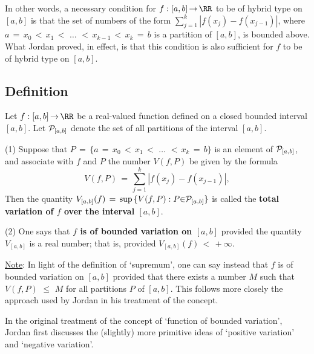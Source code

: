     In other words, a necessary condition for $f:[a,b] \,{\rightarrow}\, {\RR}$ to be of hybrid type on $[a,b]$ is that the set of numbers of the form $\sum_{j=1}^{k} |f(x_{j})-f(x_{j-1})|$, where $a \,=\, x_{0}\,<\,x_{1}\,<\,\,{\ldots}\,\,<\,x_{k-1}\,<\,x_{k} \,=\, b$ is a partition of $[a,b]$, is bounded above.
    What Jordan proved, in effect, is that this condition is also sufficient for $f$ to be of hybrid type on $[a,b]$.


\V
\V

             \subsection{\small{\bf Definition}}
            \label{DefF40.190A}

        Let $f:[a,b] \,{\rightarrow}\, {\RR}$ be a real-valued function defined on a closed bounded interval $[a,b]$.
    Let ${\cal P}_{[a,b]}$ denote the set of all partitions of the interval $[a,b]$.

\V

        (1) Suppose that $P \,=\, \{a \,=\, x_{0}\,<\,x_{1}\,<\,\,{\ldots}\,\,<\,x_{k} \,=\, b\}$ is an element of ${\cal P}_{[a,b]}$, 
    and associate with $f$ and $P$ the number $V(f,P)$ be given by the formula
        \begin{equation}
        \label{EqnF.95A}
        V(f,P) \,=\, \sum_{j=1}^{k} |f(x_{j})-f(x_{j-1})|,
        \end{equation}
    Then the quantity $V_{[a,b]}(f) \,=\, {\sup}\,\{V(f,P): P{\in}{\cal P}_{[a,b]}\}$ is called the {\bf total variation of $f$ over the interval $[a,b]$}.
    
\V

        (2) One says that {\bf $f$ is of bounded variation on $[a,b]$} provided the quantity $V_{[a,b]}$ is a real number;
    that is, provided $V_{[a,b]}(f)\,<\,+{\infty}$.

        \underline{Note}: In light of the definition of `supremum', one can say instead that $f$ is of bounded variation on $[a,b]$
    provided that there exists a number $M$ such that $V(f,P)\,\,{\leq}\,\,M$ for all partitions $P$ of $[a,b]$.
    This follows more closely the approach used by Jordan in his treatment of the concept.

\V
\V


        In the original treatment of the concept of `function of bounded variation',
    Jordan first discusses the (slightly) more primitive ideas of `positive variation' and `negative variation'.

